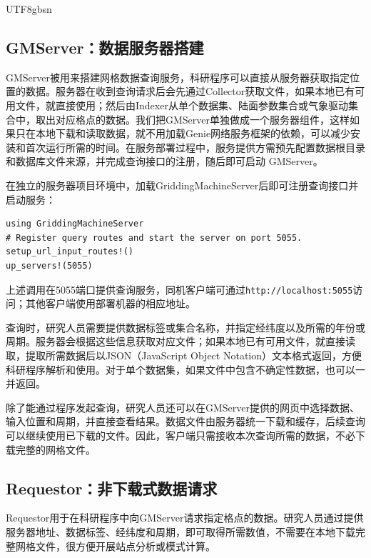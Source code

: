 \documentclass[numdoi]{chinese}
\begin{document}
\begin{CJK}{UTF8}{gbsn}
\subsection{GMServer：数据服务器搭建}

GMServer被用来搭建网格数据查询服务，科研程序可以直接从服务器获取指定位置的数据。服务器在收到查询请求后会先通过Collector获取文件，如果本地已有可用文件，就直接使用；然后由Indexer从单个数据集、\allowbreak{}陆面参数集合或气象驱动集合中，取出对应格点的数据。我们把GMServer单独做成一个服务器组件，这样如果只在本地下载和读取数据，就不用加载Genie网络服务框架的依赖，可以减少安装和首次运行所需的时间。在服务部署过程中，服务提供方需预先配置数据根目录和数据库文件来源，并完成查询接口的注册，随后即可启动 GMServer。

在独立的服务器项目环境中，加载GriddingMachineServer后即可注册查询接口并启动服务：

\begingroup\singlespacing
\begin{Verbatim}[fontsize=\small,frame=single,framesep=5pt]
using GriddingMachineServer
# Register query routes and start the server on port 5055.
setup_url_input_routes!()
up_servers!(5055)
\end{Verbatim}
\endgroup

上述调用在5055端口提供查询服务，同机客户端可通过\nolinkurl{http://localhost:5055}访问；其他客户端使用部署机器的相应地址。

查询时，研究人员需要提供数据标签或集合名称，并指定经纬度以及所需的年份或周期。服务器会根据这些信息获取对应文件；如果本地已有可用文件，就直接读取，提取所需数据后以JSON（JavaScript Object Notation）文本格式返回，方便科研程序解析和使用。对于单个数据集，如果文件中包含不确定性数据，也可以一并返回。

除了能通过程序发起查询，研究人员还可以在GMServer提供的网页中选择数据、\allowbreak{}输入位置和周期，并直接查看结果。数据文件由服务器统一下载和缓存，后续查询可以继续使用已下载的文件。因此，客户端只需接收本次查询所需的数据，不必下载完整的网格文件。

\subsection{Requestor：非下载式数据请求}

Requestor用于在科研程序中向GMServer请求指定格点的数据。研究人员通过提供服务器地址、\allowbreak{}数据标签、\allowbreak{}经纬度和周期，即可取得所需数值，不需要在本地下载完整网格文件，很方便开展站点分析或模式计算。


\end{CJK}
\end{document}
